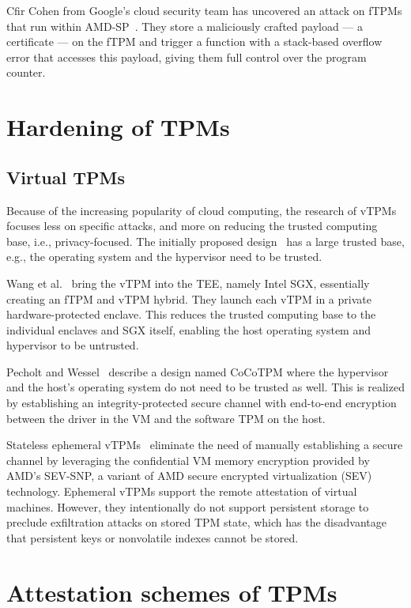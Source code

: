 Cfir Cohen from Google's cloud security team has uncovered an attack on fTPMs that run within AMD-SP~\cite{cohen}. They store a maliciously crafted payload --- a certificate --- on the fTPM and trigger a function with a stack-based overflow error that accesses this payload, giving them full control over the program counter.

\section{Hardening of TPMs}

\subsection{Virtual TPMs}

Because of the increasing popularity of cloud computing, the research of vTPMs focuses less on specific attacks, and more on reducing the trusted computing base, i.e., privacy-focused. The initially proposed design~\cite{268868} has a large trusted base, e.g., the operating system and the hypervisor need to be trusted.

Wang et al.~\cite{Wang2019} bring the vTPM into the \ac{TEE}, namely Intel SGX, essentially creating an fTPM and vTPM hybrid. They launch each vTPM in a private hardware-protected enclave. This reduces the trusted computing base to the individual enclaves and SGX itself, enabling the host operating system and hypervisor to be untrusted.

Pecholt and Wessel~\cite{Pecholt2022} describe a design named CoCoTPM where the hypervisor and the host's operating system do not need to be trusted as well. This is realized by establishing an integrity-protected secure channel with end-to-end encryption between the driver in the VM and the software TPM on the host.

Stateless ephemeral vTPMs~\cite{Narayanan2023} eliminate the need of manually establishing a secure channel by leveraging the confidential VM memory encryption provided by AMD's SEV-SNP, a variant of AMD secure encrypted virtualization (SEV) technology.
Ephemeral vTPMs support the remote attestation of virtual machines.
However, they intentionally do not support persistent storage to preclude exfiltration attacks on stored TPM state, which has the disadvantage that persistent keys or nonvolatile indexes cannot be stored.

\section{Attestation schemes of TPMs}

